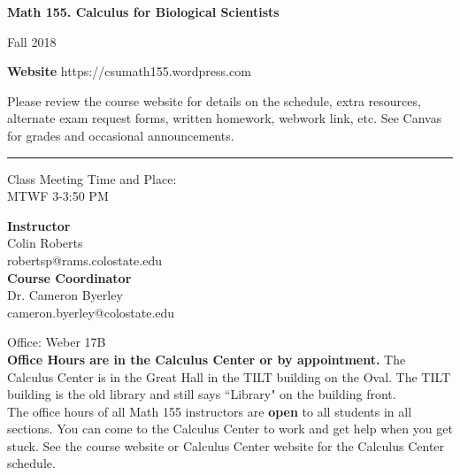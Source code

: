 \documentclass[11pt]{article}
\begin{document}
\pagestyle{empty}


\noindent \textbf{\textsf{Math 155.  Calculus for Biological Scientists}}

\noindent  Fall 2018

\vspace{2mm}

\noindent 
\textbf{Website} https://csumath155.wordpress.com

\noindent Please review the course website for details on the schedule, extra resources, alternate exam request forms, written homework, webwork link, etc. See Canvas for grades and occasional announcements.

\vspace{5mm}


\hrule

\vspace{3mm}



\noindent Class Meeting Time and Place: \\
MTWF 3-3:50 PM


\hspace{1cm} 	


\vspace{2 mm}

\textbf{Instructor}\\
Colin Roberts\\
robertsp@rams.colostate.edu\\

\textbf{Course Coordinator} \\
Dr. Cameron Byerley \\
cameron.byerley@colostate.edu

   \hspace{1cm} Office: Weber 17B \\
   


 
\textbf{Office Hours are in the Calculus Center or by appointment.} 
 The Calculus Center is in the Great Hall in the TILT building on the Oval. The TILT building is the old library and still says ``Library" on the building front.\\
\hspace{10mm} The office hours of all Math 155 instructors are \textbf{open} to all students in all sections.    You can come to the Calculus Center to work and get help when you get stuck.  See the course website or Calculus Center website for the Calculus Center schedule.  \\
\end{document}
